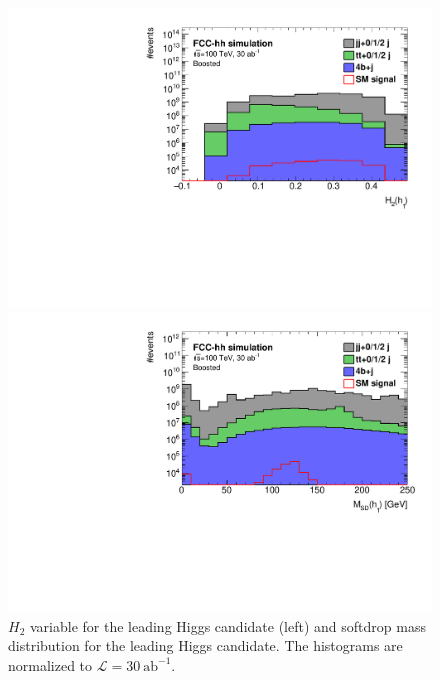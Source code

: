 \begin{figure}
	\centering
	\begin{minipage}{.5\textwidth}
		\centering
		\includegraphics[trim={.65cm 0 0 0},clip,width=\linewidth]{./Figures/hist_h1_FW2_stack.pdf}
	\end{minipage}%
	\begin{minipage}{.5\textwidth}
		\centering
		\includegraphics[trim={0 0 .65cm 0},clip,width=\linewidth]{./Figures/hist_h1_softdrop_M_stack.pdf}
	\end{minipage}
	\label{fig:M_stack}
	\caption{$H_2$ variable for the leading Higgs candidate (left) and softdrop mass distribution for the leading Higgs candidate. The histograms are normalized to $\mathcal{L}=30~\text{ab}^{-1}$.}
\end{figure} 

